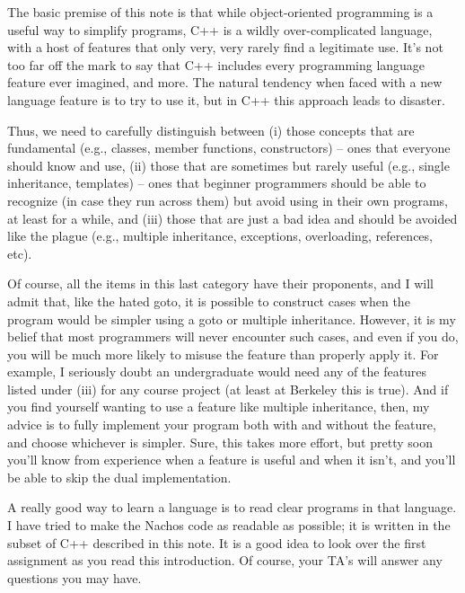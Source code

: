 The basic premise of this note is that while object-oriented
programming is a useful way to simplify programs, C++ is a wildly
over-complicated
language, with a host of features that only very, very rarely find a
legitimate use.  It's not too far off the mark to say that C++ includes
every programming language feature ever imagined, and more.
The natural tendency when faced with a new language feature
is to try to use it, but in C++ this approach leads to disaster.

Thus, we need to carefully distinguish between (i) those concepts
that are fundamental (e.g., classes, member functions, constructors)
-- ones that everyone should know and use, (ii) those that are sometimes
but rarely useful (e.g., single inheritance, templates) -- ones that
beginner programmers should be able to recognize (in case they run across
them) but avoid using in their own programs, at least for a while,
and (iii) those that are just a bad idea and should be avoided like
the plague (e.g., multiple inheritance, exceptions, overloading,
references, etc).

Of course, all the items in this last category have their proponents,
and I will admit that, like the hated goto, it is possible to
construct cases when the program would be simpler using a goto or
multiple inheritance.  However, it is
my belief that most programmers will never encounter such cases,
and even if you do, you will be much more likely to misuse the
feature than properly apply it.
For example, I seriously doubt an undergraduate would need any of
the features listed under (iii) for any course project (at least
at Berkeley this is true).  And if you find yourself wanting to use
a feature like multiple inheritance, then, my advice is to fully
implement your program both with and without the feature, and choose
whichever is simpler.  Sure, this takes more effort, but
pretty soon you'll know from experience when a feature is useful and when
it isn't, and you'll be able to skip the dual implementation.

A really good way to learn a language is to read clear programs in that
language.  I have tried to make the Nachos code as readable as possible;
it is written in the subset of C++ described in this note.
It is a good idea to look over the first assignment as you read this
introduction.  Of course, your TA's will answer any questions you may
have.

